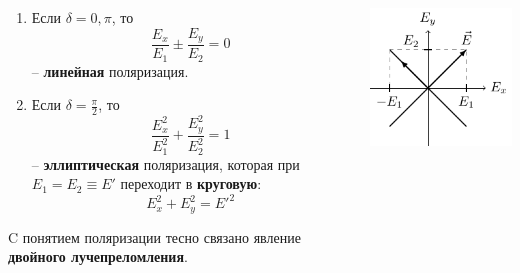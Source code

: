 \documentclass[10pt,pdf,hyperref={unicode}, dvipsnames]{beamer}
\begin{document}
\begin{frame}
	\begin{columns}
		\begin{column}{0.7\textwidth}
			\begin{enumerate}
				\item Если $\delta=0, \pi$, то
				      \begin{equation*}				
					      \frac{E_x}{E_1}\pm\frac{E_y}{E_2}=0
				      \end{equation*}
				      -- \textbf{линейная} поляризация.
				      \vspace{1em}
				\item Если $\delta=\frac{\pi}{2}$, то\\
				      \begin{equation*}				
					      \frac{E_x^2}{E_1^2}+\frac{E_y^2}{E_2^2}=1				
				      \end{equation*}
				      -- \textbf{эллиптическая} поляризация, которая при $E_1=E_2 \equiv E'$ переходит в \textbf{круговую}:
				      \begin{equation*}				
					      E_x^2+E_y^2=E'^2
				      \end{equation*}
			\end{enumerate}
			C понятием поляризации тесно связано явление \textbf{двойного лучепреломления}.
		\end{column}
		\begin{column}{0.3\textwidth}
			\includegraphics[width=\textwidth]{images/linear_polarisation}

\end{column}
\end{columns}
\end{frame}
\end{document}
